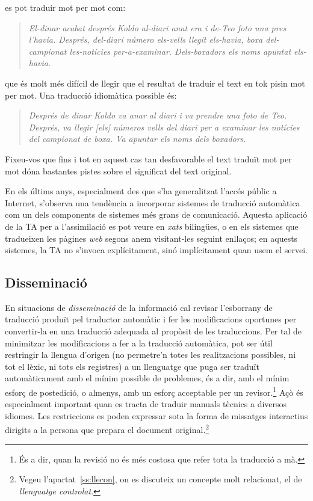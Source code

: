 es pot traduir mot per mot com:
\begin{quote}{\sl El-dinar acabat després Koldo al-diari anat era i
    de-Teo foto una pres l'havia. Després, del-diari número els-vells
    llegit els-havia, boxa del-campionat les-notícies
    per-a-examinar. Dels-boxadors els noms apuntat els-havia.}
\end{quote}
que és molt més difícil de llegir que el resultat de traduir el text
en tok pisin mot per mot. Una traducció idiomàtica possible és:
\begin{quote}{\sl Després de dinar Koldo va anar al diari i va prendre
    una foto de Teo. Després, va llegir [els] números vells del diari
    per a examinar les notícies del campionat de boxa. Va apuntar els
    noms dels boxadors.}
\end{quote}   
Fixeu-vos que fins i tot en aquest cas tan desfavorable el text
traduït mot per mot dóna bastantes pistes sobre el significat del text
original.

En els últims anys, especialment des que s'ha generalitzat l'accés
públic a Internet, s'observa una tendència a incorporar sistemes de
traducció automàtica com un dels components de sistemes més grans de
comunicació.  Aquesta aplicació de la TA per a l'assimilació es pot
veure en \emph{xats} bilingües, o en els sistemes que tradueixen les
pàgines \emph{web} segons anem visitant-les seguint enllaços; en
aquests sistemes, la TA no s'invoca explícitament, sinó implícitament
quan usem el servei.

\subsection{Disseminació} 
En situacions de \emph{disseminació} de la informació cal revisar
l'esborrany de traducció produït pel traductor automàtic i fer les
modificacions oportunes per convertir-la en una traducció adequada al
propòsit de les traduccions.  Per tal de minimitzar les modificacions
a fer a la traducció automàtica, pot ser útil restringir la llengua
d'origen (no permetre'n totes les realitzacions possibles, ni tot el
lèxic, ni tots els registres) a un llenguatge que puga ser traduït
automàticament amb el mínim possible de problemes, és a dir, amb el
mínim esforç de postedició, o almenys, amb un esforç acceptable per un
revisor.\footnote{És a dir, quan la revisió no és més costosa que
  refer tota la traducció a mà.} Açò és especialment important quan es
tracta de traduir manuals tècnics a diversos idiomes. Les restriccions
es poden expressar sota la forma de missatges interactius dirigits a
la persona que prepara el document original.\footnote{Vegeu
  l'apartat~\ref{ss:llecon}, on es discuteix un concepte molt
  relacionat, el de \emph{llenguatge controlat}.}

